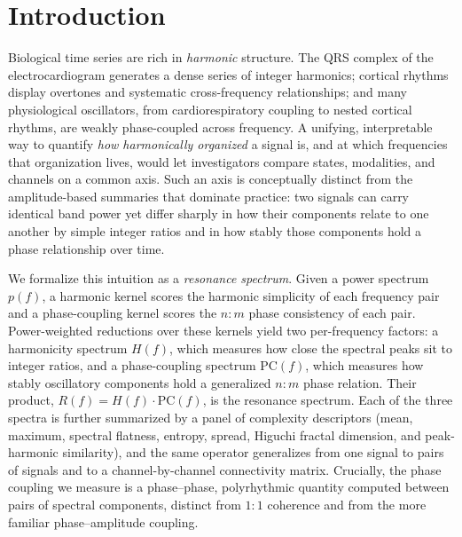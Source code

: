 \documentclass[11pt]{article}
\begin{document}
\section{Introduction}
Biological time series are rich in \emph{harmonic} structure. The QRS complex of the electrocardiogram generates a dense series of integer harmonics; cortical rhythms display overtones and systematic cross-frequency relationships; and many physiological oscillators, from cardiorespiratory coupling to nested cortical rhythms, are weakly phase-coupled across frequency. A unifying, interpretable way to quantify \emph{how harmonically organized} a signal is, and at which frequencies that organization lives, would let investigators compare states, modalities, and channels on a common axis. Such an axis is conceptually distinct from the amplitude-based summaries that dominate practice: two signals can carry identical band power yet differ sharply in how their components relate to one another by simple integer ratios and in how stably those components hold a phase relationship over time.

We formalize this intuition as a \emph{resonance spectrum}. Given a power spectrum $p(f)$, a harmonic kernel scores the harmonic simplicity of each frequency pair and a phase-coupling kernel scores the $n{:}m$ phase consistency of each pair. Power-weighted reductions over these kernels yield two per-frequency factors: a harmonicity spectrum $H(f)$, which measures how close the spectral peaks sit to integer ratios, and a phase-coupling spectrum $\mathrm{PC}(f)$, which measures how stably oscillatory components hold a generalized $n{:}m$ phase relation. Their product, $R(f) = H(f)\cdot\mathrm{PC}(f)$, is the resonance spectrum. Each of the three spectra is further summarized by a panel of complexity descriptors (mean, maximum, spectral flatness, entropy, spread, Higuchi fractal dimension, and peak-harmonic similarity), and the same operator generalizes from one signal to pairs of signals and to a channel-by-channel connectivity matrix. Crucially, the phase coupling we measure is a phase--phase, polyrhythmic quantity computed between pairs of spectral components, distinct from $1{:}1$ coherence and from the more familiar phase--amplitude coupling.
\end{document}
